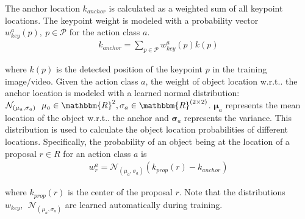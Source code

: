 \documentclass[10pt,twocolumn,letterpaper]{article}
\makeatletter
\newcommand{\ve}[1]{{\mathbf #1}} \newcommand{\hua}[1]{{\mathcal #1}}
\newcommand{\scr}[1]{{\mathcal #1}}
\DeclareRobustCommand\onedot{\futurelet\@let@token\@onedot}
\def\onedot{\ifx\@let@token.\else.\null\fi\xspace}
\def\wrt{w.r.t\onedot}
\makeatother
\begin{document}
The anchor location $k_{anchor}$ is calculated as a weighted sum of all keypoint locations. The keypoint weight is modeled with a probability vector $w_{key}^a(p),~ p \in \hua{P}$ for the action class $a$.
\vspace{-0.3\baselineskip}
{\small
\begin{align}
\label{eqn:anchor}
k_{anchor} = \sum_{p \in \hua{P}} w_{key}^a(p) k(p)
\end{align}}
\vspace{-0.6\baselineskip}

\noindent where $k(p)$ is the detected position of the keypoint $p$ in the training image/video.
Given the action class $a$, the weight of object location \wrt the anchor location is modeled with a learned normal distribution: $\scr{N}_{(\ve{\mu}_a, \ve{\sigma}_a)}~~\ve{\mu}_a\in \mathbbm{R}^2, \ve{\sigma}_a\in \mathbbm{R}^{(2\times2)}$. $\ve{\mu}_a$ represents the mean location of the object \wrt the anchor and $\ve{\sigma}_a$ represents the variance. This distribution is used to calculate the object location probabilities of different locations. Specifically, the probability of an object being at the location of a proposal $r \in R$ for an action class $a$ is 
\vspace{-0.3\baselineskip}
{\small
\begin{align}
w_r^{a}=\scr{N}_{(\mu_a, \sigma_a)}(k_{prop}(r)- k_{anchor})
\label{eqn:obj_weight}
\end{align}}
\vspace{-0.5\baselineskip}

\noindent where $k_{prop}(r)$ is the center of the proposal $r$. Note that the distributions $w_{key},~~\scr{N}_{(\mu_a, \sigma_a)}$ are learned automatically during training.
\vspace{-0.2\baselineskip}
\end{document}
